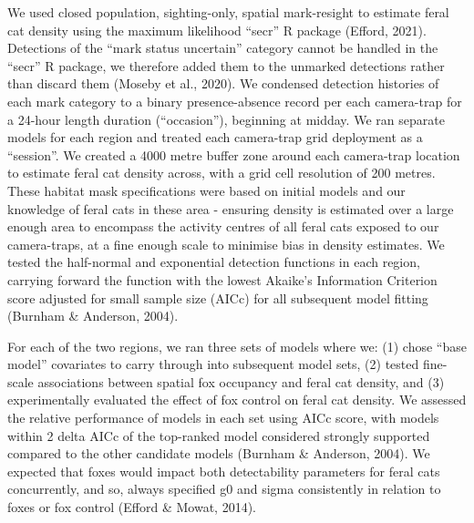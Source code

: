 \documentclass[]{elsarticle} %
\begin{document}
We used closed population, sighting-only, spatial mark-resight to estimate feral cat density using the maximum likelihood ``secr'' R package (Efford, 2021). Detections of the ``mark status uncertain'' category cannot be handled in the ``secr'' R package, we therefore added them to the unmarked detections rather than discard them (Moseby et al., 2020). We condensed detection histories of each mark category to a binary presence-absence record per each camera-trap for a 24-hour length duration (``occasion''), beginning at midday. We ran separate models for each region and treated each camera-trap grid deployment as a ``session''. We created a 4000 metre buffer zone around each camera-trap location to estimate feral cat density across, with a grid cell resolution of 200 metres. These habitat mask specifications were based on initial models and our knowledge of feral cats in these area - ensuring density is estimated over a large enough area to encompass the activity centres of all feral cats exposed to our camera-traps, at a fine enough scale to minimise bias in density estimates. We tested the half-normal and exponential detection functions in each region, carrying forward the function with the lowest Akaike's Information Criterion score adjusted for small sample size (AICc) for all subsequent model fitting (Burnham \& Anderson, 2004).

For each of the two regions, we ran three sets of models where we: (1) chose ``base model'' covariates to carry through into subsequent model sets, (2) tested fine-scale associations between spatial fox occupancy and feral cat density, and (3) experimentally evaluated the effect of fox control on feral cat density. We assessed the relative performance of models in each set using AICc score, with models within 2 delta AICc of the top-ranked model considered strongly supported compared to the other candidate models (Burnham \& Anderson, 2004). We expected that foxes would impact both detectability parameters for feral cats concurrently, and so, always specified g0 and sigma consistently in relation to foxes or fox control (Efford \& Mowat, 2014).
\end{document}
